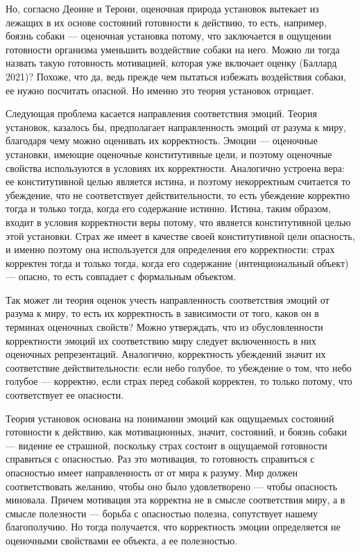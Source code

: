 \documentclass[11pt]{book}
\begin{document}
Но, согласно Деонне и Терони, оценочная природа установок вытекает из лежащих в их основе состояний готовности к действию, то есть, например, боязнь собаки --- оценочная установка потому, что заключается в ощущении готовности организма уменьшить воздействие собаки на него. Можно ли тогда назвать такую готовность мотивацией, которая уже включает оценку (Баллард 2021)? Похоже, что да, ведь прежде чем пытаться избежать воздействия собаки, ее нужно посчитать опасной. Но именно это теория установок отрицает.

Следующая проблема касается направления соответствия эмоций. Теория установок, казалось бы, предполагает направленность эмоций от разума к миру, благодаря чему можно оценивать их корректность. Эмоции --- оценочные установки, имеющие оценочные конститутивные цели, и поэтому оценочные свойства используются в условиях их корректности. Аналогично устроена вера: ее конститутивной целью является истина, и поэтому некорректным считается то убеждение, что не соответствует действительности, то есть убеждение корректно тогда и только тогда, когда его содержание истинно. Истина, таким образом, входит в условия корректности веры потому, что является конститутивной целью этой установки. Страх же имеет в качестве своей конститутивной цели опасность, и именно поэтому она используется для определения его корректности: страх корректен тогда и только тогда, когда его содержание (интенциональный объект) --- опасно, то есть совпадает с формальным объектом.

Так может ли теория оценок учесть направленность соответствия эмоций от разума к миру, то есть их корректность в зависимости от того, каков он в терминах оценочных свойств? Можно утверждать, что из обусловленности корректности эмоций их соответствию миру следует включенность в них оценочных репрезентаций. Аналогично, корректность убеждений значит их соответствие действительности: если небо голубое, то убеждение о том, что небо голубое --- корректно, если страх перед собакой корректен, то только потому, что соответствует ее опасности.

Теория установок основана на понимании эмоций как ощущаемых состояний готовности к действию, как мотивационных, значит, состояний, и боязнь собаки --- видение ее страшной, поскольку страх состоит в ощущаемой готовности справиться с опасностью. Раз это мотивация, то готовность справиться с опасностью имеет направленность от от мира к разуму. Мир должен соответствовать желанию, чтобы оно было удовлетворено --- чтобы опасность миновала. Причем мотивация эта корректна не в смысле соответствия миру, а в смысле полезности --- борьба с опасностью полезна, сопутствует нашему благополучию. Но тогда получается, что корректность эмоции определяется не оценочными свойствами ее объекта, а ее полезностью.
\end{document}
